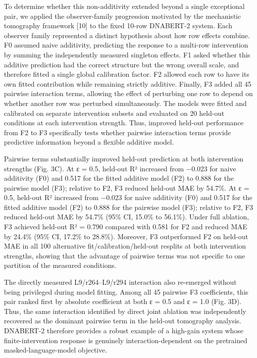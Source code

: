 \documentclass[11pt]{article}
\begin{document}
To determine whether this non-additivity extended beyond a single exceptional pair, we applied the observer-family progression motivated by the mechanistic tomography framework [10] to the fixed 10-row DNABERT-2 system. Each observer family represented a distinct hypothesis about how row effects combine. F0 assumed naive additivity, predicting the response to a multi-row intervention by summing the independently measured singleton effects. F1 asked whether this additive prediction had the correct structure but the wrong overall scale, and therefore fitted a single global calibration factor. F2 allowed each row to have its own fitted contribution while remaining strictly additive. Finally, F3 added all 45 pairwise interaction terms, allowing the effect of perturbing one row to depend on whether another row was perturbed simultaneously. The models were fitted and calibrated on separate intervention subsets and evaluated on 20 held-out conditions at each intervention strength. Thus, improved held-out performance from F2 to F3 specifically tests whether pairwise interaction terms provide predictive information beyond a flexible additive model.

Pairwise terms substantially improved held-out prediction at both intervention strengths (Fig. 3C). At ε = 0.5, held-out R² increased from −0.023 for naive additivity (F0) and 0.517 for the fitted additive model (F2) to 0.888 for the pairwise model (F3); relative to F2, F3 reduced held-out MAE by 54.7\%. At ε = 0.5, held-out R² increased from −0.023 for naive additivity (F0) and 0.517 for the fitted additive model (F2) to 0.888 for the pairwise model (F3); relative to F2, F3 reduced held-out MAE by 54.7\% (95\% CI, 15.0\% to 56.1\%). Under full ablation, F3 achieved held-out R² = 0.790 compared with 0.581 for F2 and reduced MAE by 24.4\% (95\% CI, 17.2\% to 28.8\%).  Moreover, F3 outperformed F2 on held-out MAE in all 100 alternative fit/calibration/held-out resplits at both intervention strengths, showing that the advantage of pairwise terms was not specific to one partition of the measured conditions.

The directly measured L9/r264–L9/r294 interaction also re-emerged without being privileged during model fitting. Among all 45 pairwise F3 coefficients, this pair ranked first by absolute coefficient at both ε = 0.5 and ε = 1.0 (Fig. 3D). Thus, the same interaction identified by direct joint ablation was independently recovered as the dominant pairwise term in the held-out tomography analysis. DNABERT-2 therefore provides a robust example of a high-gain system whose finite-intervention response is genuinely interaction-dependent on the pretrained masked-language-model objective.
\end{document}
